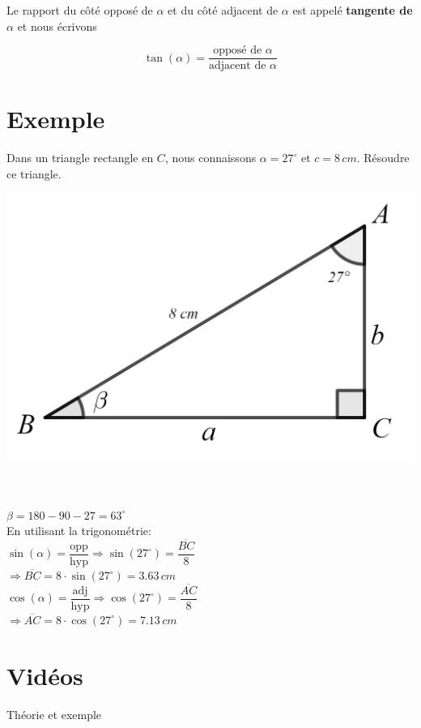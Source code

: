 \documentclass[a4paper,11pt]{article}
\begin{document}
Le rapport du côté opposé de $\alpha$ et du côté adjacent de $\alpha$ est appelé \textbf{tangente de $\alpha$} et nous écrivons

$$\tan(\alpha)=\frac{\text{opposé de }\alpha}{\text{adjacent de }\alpha}$$


\section{Exemple}
Dans un triangle rectangle en $C$, nous connaissons $\alpha=27^{\circ}$ et $c=8\,cm$. Résoudre ce triangle.\\
\begin{multicols}{2}
\begin{center}
\includegraphics[width=1\textwidth]{images/trianglerectexemple.png}\\
\end{center}
\phantom{a}\\
\phantom{a}\\
$\beta=180-90-27=63^{\circ}$\\
En utilisant la trigonométrie:\\
$\sin(\alpha)=\dfrac{\text{opp}}{\text{hyp}} \Rightarrow \sin(27^{\circ})=\dfrac{\overline{BC}}{8}$\\
$\Rightarrow \overline{BC}=8 \cdot \sin(27^{\circ})=3.63\,cm$\\
$\cos(\alpha)=\dfrac{\text{adj}}{\text{hyp}} \Rightarrow \cos(27^{\circ})=\dfrac{\overline{AC}}{8}$\\
$\Rightarrow \overline{AC}=8 \cdot \cos(27^{\circ})=7.13\,cm$\\
\end{multicols}

\section{Vidéos}
Théorie et exemple\\
 
\end{document}
